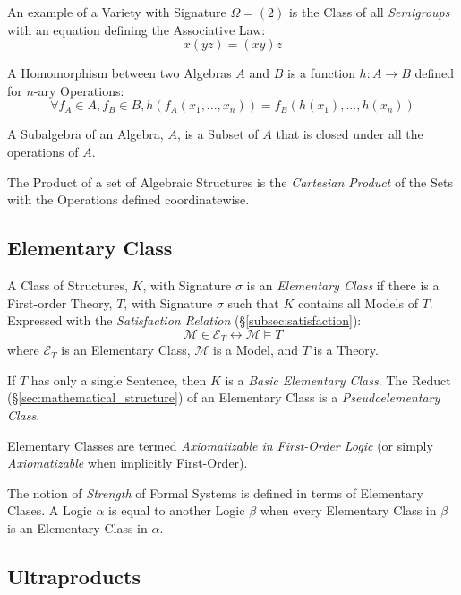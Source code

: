 \documentclass{article}
\begin{document}
An example of a Variety with Signature $\Omega = (2)$ is the Class of
all \emph{Semigroups} with an equation defining the Associative Law:
\[
    x(yz) = (xy)z
\]

A Homomorphism between two Algebras $A$ and $B$ is a function $h: A
\rightarrow B$ defined for $n$-ary Operations:
\[
\forall f_A \in A, f_B \in B, h(f_A(x_1, ..., x_n)) = f_B(h(x_1), ...,
h(x_n))
\]

A Subalgebra of an Algebra, $A$, is a Subset of $A$ that is closed
under all the operations of $A$.

The Product of a set of Algebraic Structures is the \emph{Cartesian
  Product} of the Sets with the Operations defined coordinatewise.

\subsection{Elementary Class}\label{subsec:elementary_class}

A Class of Structures, $K$, with Signature $\sigma$ is an
\emph{Elementary Class} if there is a First-order Theory, $T$, with
Signature $\sigma$ such that $K$ contains all Models of $T$.
Expressed with the \emph{Satisfaction Relation}
(\S\ref{subsec:satisfaction}):
\[
    \mathcal{M} \in \mathcal{E}_T \leftrightarrow \mathcal{M} \vDash T
\]
where $\mathcal{E}_T$ is an Elementary Class, $\mathcal{M}$ is a
Model, and $T$ is a Theory.

If $T$ has only a single Sentence, then $K$ is a \emph{Basic
  Elementary Class}. The Reduct (\S\ref{sec:mathematical_structure})
of an Elementary Class is a \emph{Pseudoelementary Class}.

Elementary Classes are termed \emph{Axiomatizable in First-Order
  Logic} (or simply \emph{Axiomatizable} when implicitly First-Order).

The notion of \emph{Strength} of Formal Systems is defined in terms of
Elementary Clases. A Logic $\alpha$ is equal to another Logic $\beta$
when every Elementary Class in $\beta$ is an Elementary Class in
$\alpha$.

\subsection{Ultraproducts}\label{subsec:ultraproducts}
\end{document}
